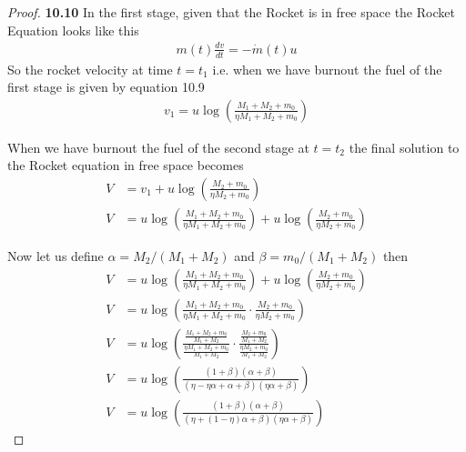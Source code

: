 \documentclass[11pt]{article}
\theoremstyle{definition}
\begin{document}
	\begin{proof}{\textbf{10.10}}
        In the first stage, given that the Rocket is in free space
        the Rocket Equation looks like this
        \begin{align*}
            m(t)\frac{dv}{dt} = -\dot{m}(t)u
        \end{align*}
        So the rocket velocity at time $t=t_1$ i.e. when we have burnout
        the fuel of the first stage is given by equation 10.9
        \begin{align*}
            v_1 = u \log(\frac{M_1 + M_2 + m_0}{\eta M_1 + M_2 + m_0})
        \end{align*}

        When we have burnout the fuel of the second stage at $t=t_2$
        the final solution to the Rocket equation in free space becomes
        \begin{align*}
            V &= v_1 + u \log(\frac{M_2 + m_0}{\eta M_2 + m_0})\\
            V &= u \log(\frac{M_1 + M_2 + m_0}{\eta M_1 + M_2 + m_0}) + 
            u \log(\frac{M_2 + m_0}{\eta M_2 + m_0})
        \end{align*}

        Now let us define $\alpha = M_2/(M_1 + M_2)$ and
        $\beta = m_0 /(M_1 + M_2)$ then 
        \begin{align*}
            V &= u \log(\frac{M_1 + M_2 + m_0}{\eta M_1 + M_2 + m_0}) + 
            u \log(\frac{M_2 + m_0}{\eta M_2 + m_0})\\
            V &= u \log(\frac{M_1 + M_2 + m_0}{\eta M_1 + M_2 + m_0} \cdot
            \frac{M_2 + m_0}{\eta M_2 + m_0})\\
            V &= u \log(
                \frac{
                    \frac{M_1 + M_2 + m_0}{M_1 + M_2}
                }{
                    \frac{\eta M_1 + M_2 + m_0}{M_1 + M_2}
                } \cdot
                \frac{
                    \frac{M_2 + m_0}{M_1 + M_2}
                }{
                    \frac{\eta M_2 + m_0}{M_1 + M_2}
                }
            )\\
            V &= u \log(
                \frac{(1 + \beta)(\alpha + \beta)}
                {(\eta - \eta\alpha + \alpha + \beta)(\eta\alpha + \beta)}
            )\\
            V &= u \log(
                \frac{(1 + \beta)(\alpha + \beta)}
                {(\eta + (1 - \eta)\alpha + \beta)(\eta\alpha + \beta)}
            )
        \end{align*}


\end{proof}
\end{document}
